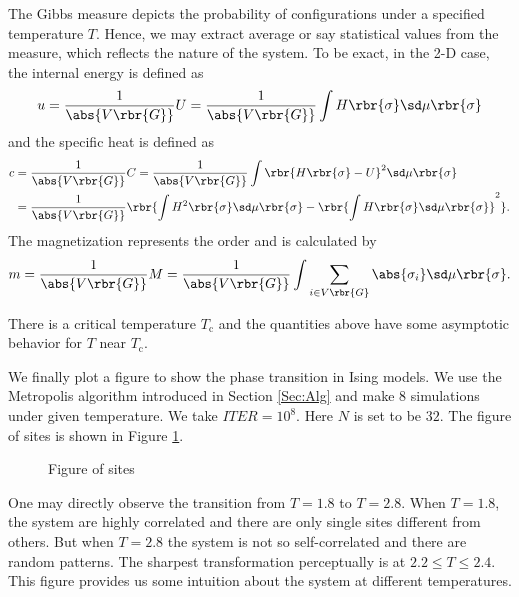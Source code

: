 \documentclass[english, nochinese]{pnote}
\begin{document}
The Gibbs measure depicts the probability of configurations under a specified temperature $T$. Hence, we may extract average or say statistical values from the measure, which reflects the nature of the system. To be exact, in the 2-D case, the internal energy is defined as
\begin{equation}
u = \frac{1}{\abs{ V \rbr{G} }} U = \frac{1}{\abs{ V \rbr{G} }} \int H \rbr{\sigma} \sd \mu \rbr{\sigma}
\end{equation}
and the specific heat is defined as
\begin{equation}
\begin{split}
c &= \frac{1}{\abs{ V \rbr{G} }} C = \frac{1}{\abs{ V \rbr{G} }} \int \rbr{ H \rbr{\sigma} - U }^2 \sd \mu \rbr{\sigma} \\
&= \frac{1}{\abs{ V \rbr{G} }} \rbr{ \int H^2 \rbr{\sigma} \sd \mu \rbr{\sigma} - \rbr{ \int H \rbr{\sigma} \sd \mu \rbr{\sigma} }^2 }.
\end{split}
\end{equation}
The magnetization represents the order and is calculated by
\begin{equation}
m = \frac{1}{\abs{ V \rbr{G} }} M = \frac{1}{\abs{ V \rbr{G} }} \int \sum_{ i \in V \rbr{G} } \abs{\sigma_i} \sd \mu \rbr{\sigma}.
\end{equation}

There is a critical temperature $T_{\text{c}}$ and the quantities above have some asymptotic behavior for $T$ near $T_{\text{c}}$.

We finally plot a figure to show the phase transition in Ising models. We use the Metropolis algorithm introduced in Section \ref{Sec:Alg} and make 8 simulations under given temperature. We take $ \mathit{ITER} = 10^8 $. Here $N$ is set to be $32$. The figure of sites is shown in Figure \ref{Fig:Sites}.

\begin{figure}[htbp]
\centering
\scalebox{0.75}
{}
\caption{Figure of sites}
\label{Fig:Sites}
\end{figure}

One may directly observe the transition from $ T = 1.8 $ to $ T = 2.8 $. When $ T = 1.8 $, the system are highly correlated and there are only single sites different from others. But when $ T = 2.8 $ the system is not so self-correlated and there are random patterns. The sharpest transformation perceptually is at $ 2.2 \le T \le 2.4 $. This figure provides us some intuition about the system at different temperatures.
\end{document}
